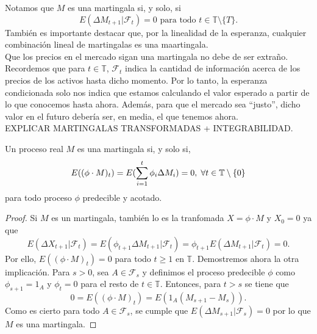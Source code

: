 Notamos que $ M $ es una martingala si, y solo, si
\[
E(\Delta M_{t+1} |\mathcal{F}_t ) = 0 \text{ para todo } t\in \mathbb{T}\setminus\{T\}.
\]
También es importante destacar que, por la linealidad de la esperanza, cualquier combinación lineal de martingalas es una maartingala. \\

Que los precios en el mercado sigan una martingala no debe de ser extraño. Recordemos que para $ t \in \mathbb{T} $, $ \mathcal{F}_t $ indica la cantidad de información acerca de los precios de los activos hasta dicho momento. Por lo tanto, la esperanza condicionada solo nos indica que estamos calculando el valor esperado a partir de lo que conocemos hasta ahora. Además, para que el mercado sea ``justo'', dicho valor en el futuro debería ser, en media, el que tenemos ahora. \\

EXPLICAR MARTINGALAS TRANSFORMADAS + INTEGRABILIDAD. \\

\begin{teoremaBox}\label{2.3.5}
	Un proceso real $ M $ es una martingala si, y solo si, 
	\[
	E((\phi \cdot M)_t) = E(\sum_{i=1}^{t}\phi_i\Delta M_i) = 0, \hspace{1mm} \forall t \in \mathbb{T}\setminus\{0\}
	\]
	para todo proceso $ \phi $ predecible y acotado.
\end{teoremaBox}
\begin{proof}
	Si $ M $ es un martingala, también lo es la tranfomada $ X = \phi \cdot M $ y $ X_0 =0 $ ya que
	\[
	E(\Delta X_{t+1}|\mathcal{F}_t) = E(\phi_{t+1}\Delta M_{t+1}|\mathcal{F}_t) =  \phi_{t+1} E(\Delta M_{t+1}|\mathcal{F}_t) = 0.
	\] 
	Por ello, $ E((\phi \cdot M)_t) = 0 $ para todo $ t \geq 1 $ en $ \mathbb{T} $.
	Demostremos ahora la otra implicación. Para $ s > 0 $, sea $ A \in \mathcal{F}_s $ y definimos el proceso predecible $ \phi $ como $ \phi_{s+1} = 1_A $ y $ \phi_t = 0 $ para el resto de $ t\in \mathbb{T} $. Entonces, para $ t > s $ se tiene que
	\[
	0 = E((\phi \cdot M)_t) = E(1_A(M_{s+1}-M_s)).
	\]
	Como es cierto para todo $ A \in \mathcal{F}_s $, se cumple que $ E(\Delta M_{s+1} | \mathcal{F}_s) = 0 $ por lo que $ M $ es una martingala.
\end{proof}

